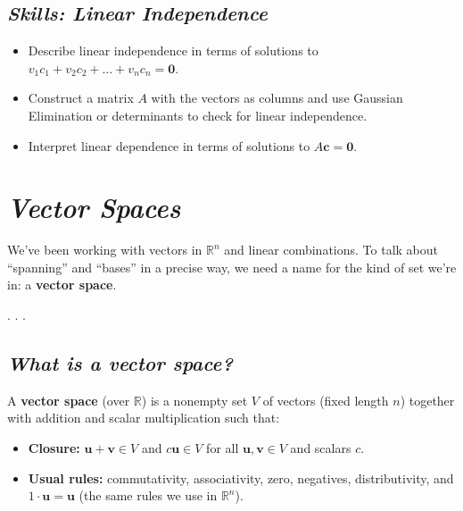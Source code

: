 \documentclass[
  letterpaper,
  DIV=11,
  numbers=noendperiod]{scrartcl}
\providecommand{\tightlist}{%
  \setlength{\itemsep}{0pt}\setlength{\parskip}{0pt}}\usepackage{longtable,booktabs,array}
\begin{document}
\subsection{\texorpdfstring{\emph{Skills: Linear
Independence}}{Skills: Linear Independence}}\label{skills-linear-independence}

\begin{itemize}
\tightlist
\item
  Describe linear independence in terms of solutions to
  \(v_1 c_1 + v_2 c_2 + \ldots + v_n c_n = \mathbf{0}\).
\item
  Construct a matrix \(A\) with the vectors as columns and use Gaussian
  Elimination or determinants to check for linear independence.
\item
  Interpret linear dependence in terms of solutions to
  \(A\mathbf{c}=\mathbf{0}\).
\end{itemize}

\section{\texorpdfstring{\emph{Vector
Spaces}}{Vector Spaces}}\label{vector-spaces}

We've been working with vectors in \(\mathbb{R}^n\) and linear
combinations. To talk about ``spanning'' and ``bases'' in a precise way,
we need a name for the kind of set we're in: a \textbf{vector space}.

. . .

\subsection{\texorpdfstring{\emph{What is a vector
space?}}{What is a vector space?}}\label{what-is-a-vector-space}

A \textbf{vector space} (over \(\mathbb{R}\)) is a nonempty set \(V\) of
vectors (fixed length \(n\)) together with addition and scalar
multiplication such that:

\begin{itemize}
\tightlist
\item
  \textbf{Closure:} \(\mathbf{u}+\mathbf{v} \in V\) and
  \(c\mathbf{u} \in V\) for all \(\mathbf{u},\mathbf{v} \in V\) and
  scalars \(c\).
\item
  \textbf{Usual rules:} commutativity, associativity, zero, negatives,
  distributivity, and \(1\cdot\mathbf{u}=\mathbf{u}\) (the same rules we
  use in \(\mathbb{R}^n\)).
\end{itemize}
\end{document}

